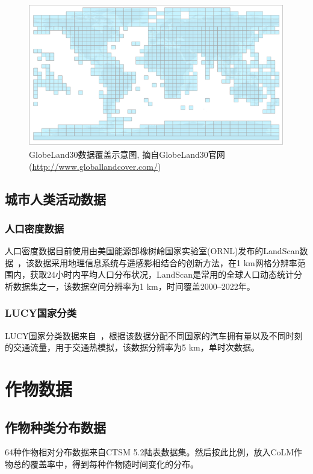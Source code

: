 {
\begin{figure}[htbp]
\centering
\includegraphics{Figures/基础数据/GlobeLand30数据覆盖示意图.png}
\captionsetup{justification=centering}
\caption[GlobeLand30数据覆盖示意图]{GlobeLand30数据覆盖示意图, 摘自GlobeLand30官网(\url{http://www.globallandcover.com/})}
\label{fig:GlobeLand30数据覆盖示意图}
\end{figure}
}


\subsection{城市人类活动数据}\label{城市人类活动数据}

\subsubsection{人口密度数据}\label{人口密度数据}
人口密度数据目前使用由美国能源部橡树岭国家实验室(ORNL)发布的LandScan数据~\citep{brightLandScanGlobal20002001}，该数据采用地理信息系统与遥感影相结合的创新方法，在1 km网格分辨率范围内，获取24小时内平均人口分布状况，LandScan是常用的全球人口动态统计分析数据集之一，该数据空间分辨率为1 km，时间覆盖2000--2022年。

\subsubsection{LUCY国家分类}\label{LUCY国家分类}
LUCY国家分类数据来自~\citet{allen2011}，根据该数据分配不同国家的汽车拥有量以及不同时刻的交通流量，用于交通热模拟，该数据分辨率为5 km，单时次数据。


\section{作物数据}

\subsection{作物种类分布数据}\label{作物种类分布数据}
64种作物相对分布数据来自CTSM 5.2陆表数据集。然后按此比例，放入CoLM作物总的覆盖率中，得到每种作物随时间变化的分布。

